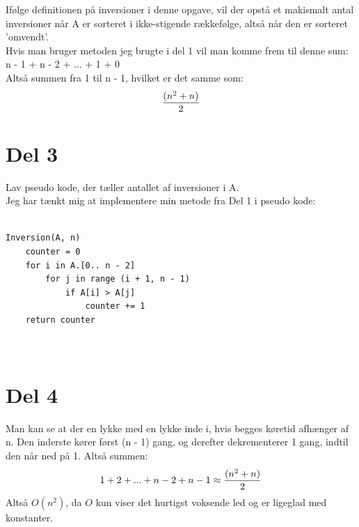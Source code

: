 \documentclass[12pt, a4paper, hidelinks]{article}
\begin{document}
Ifølge definitionen på inversioner i denne opgave, vil der opstå et makismalt antal inversioner når A er sorteret i ikke-stigende rækkefølge, altså når den er sorteret 'omvendt'. \\

Hvis man bruger metoden jeg brugte i del 1 vil man komme frem til denne sum: \\

n - 1 + n - 2 + ... + 1 + 0 \\

Altså summen fra 1 til n - 1, hvilket er det samme som: \\

\[ {(n^2 + n) \over 2} \]

\section{Del 3}
Lav pseudo kode, der tæller antallet af inversioner i A. \\

Jeg har tænkt mig at implementere min metode fra Del 1 i pseudo kode:


\begin{lstlisting}

Inversion(A, n)
	counter = 0
	for i in A.[0.. n - 2]
		for j in range (i + 1, n - 1)
			if A[i] > A[j]
				counter += 1
	return counter
		
		
\end{lstlisting}

\section{Del 4}

Man kan se at der en lykke med en lykke inde i, hvis begges køretid afhænger af n. Den inderste kører først (n - 1) gang, og derefter dekrementerer 1 gang, indtil den når ned på 1. Altså summen: \[ 1 + 2 + ... + n - 2 + n - 1 \approx  {(n^2 + n) \over 2} \] 
 Altså $ O(n^2) $, da $O$ kun viser det hurtigst voksende led og er ligeglad med konstanter.












\end{document}
